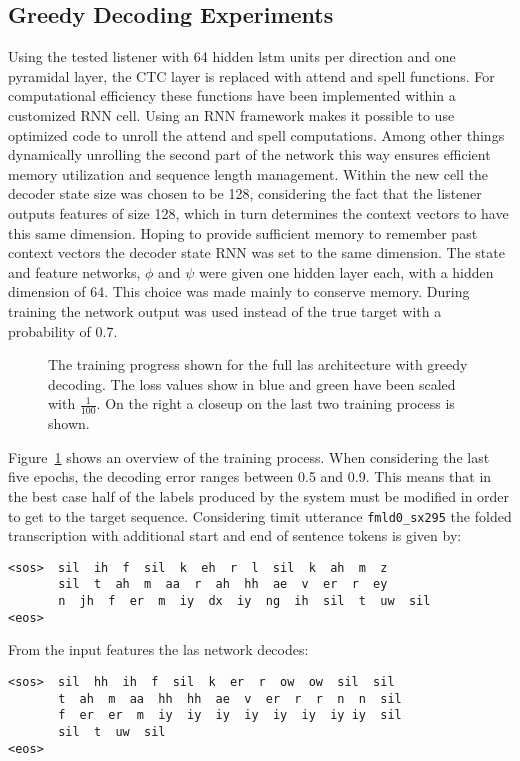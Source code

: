 \subsection{Greedy Decoding Experiments}
\label{sec:greedy}
Using the tested listener with 64 hidden lstm units per direction and one pyramidal layer, the CTC layer is replaced with attend and spell functions. For computational efficiency these functions have been implemented within a customized RNN cell. Using an RNN framework makes it possible to use optimized code to unroll the attend and spell
computations. Among other things dynamically unrolling the second part of the network this way ensures efficient memory utilization and sequence length management. Within the new cell the decoder state size was chosen to be 128, considering the fact that the listener outputs features of size 128, which in turn determines the context vectors to have this same dimension.  Hoping to provide sufficient memory to remember past context vectors the decoder state RNN was set to the same dimension.
The state and feature networks, $\phi$ and $\psi$ were given one hidden layer each, with a hidden dimension of 64. This choice was made mainly to conserve memory. During training the network output was used instead of the true target with a probability of 0.7.
\begin{figure}


\caption{The training progress shown for the full las architecture with greedy decoding. The loss values show in blue and green have been scaled with $\frac{1}{100}$. On the right a closeup on the last two training process is shown.}
\label{fig:lasGreedy}
\end{figure}
Figure~\ref{fig:lasGreedy} shows an overview of the training process. When considering the last five epochs, the decoding error  ranges between 0.5 and 0.9. This means that in the best case half of the labels produced by the system must be modified in order to
get to the target sequence. Considering timit utterance \texttt{fmld0\_sx295} the folded transcription with additional start and end of sentence tokens is given by:
\begin{lstlisting}[caption={Targets}]
<sos>  sil  ih  f  sil  k  eh  r  l  sil  k  ah  m  z
       sil  t  ah  m  aa  r  ah  hh  ae  v  er  r  ey
       n  jh  f  er  m  iy  dx  iy  ng  ih  sil  t  uw  sil
<eos>
\end{lstlisting}
From the input features the las network decodes:
\begin{lstlisting}[caption={Network output}]
<sos>  sil  hh  ih  f  sil  k  er  r  ow  ow  sil  sil
       t  ah  m  aa  hh  hh  ae  v  er  r  r  n  n  sil
       f  er  er  m  iy  iy  iy  iy  iy  iy  iy iy  sil
       sil  t  uw  sil
<eos>
\end{lstlisting}
